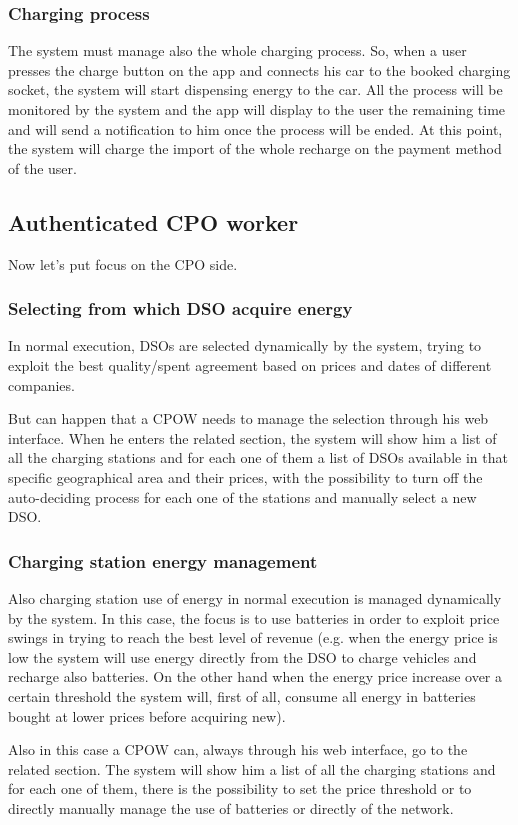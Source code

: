 \documentclass[a4paper]{report}
\begin{document}
\subsubsection{Charging process}
The system must manage also the whole charging process. So, when a user presses the charge button on the app and connects his car to the booked charging socket, the system will start dispensing energy to the car. All the process will be monitored by the system and the app will display to the user the remaining time and will send a notification to him once the process will be ended. At this point, the system will charge the import of the whole recharge on the payment method of the user.

\subsection{Authenticated CPO worker}
Now let's put focus on the CPO side.
\subsubsection{Selecting from which DSO acquire energy}
In normal execution, DSOs are selected dynamically by the system, trying to exploit the best quality/spent agreement based on prices and dates of different companies.

But can happen that a CPOW needs to manage the selection through his web interface. When he enters the related section, the system will show him a list of all the charging stations and for each one of them a list of DSOs available in that specific geographical area and their prices, with the possibility to turn off the auto-deciding process for each one of the stations and manually select a new DSO.
\subsubsection{Charging station energy management}
Also charging station use of energy in normal execution is managed dynamically by the system. In this case, the focus is to use batteries in order to exploit price swings in trying to reach the best level of revenue (e.g. when the energy price is low the system will use energy directly from the DSO to charge vehicles and recharge also batteries. On the other hand when the energy price increase over a certain threshold the system will, first of all, consume all energy in batteries bought at lower prices before acquiring new).

Also in this case a CPOW can, always through his web interface, go to the related section. The system will show him a list of all the charging stations and for each one of them, there is the possibility to set the price threshold or to directly manually manage the use of batteries or directly of the network.
\end{document}
